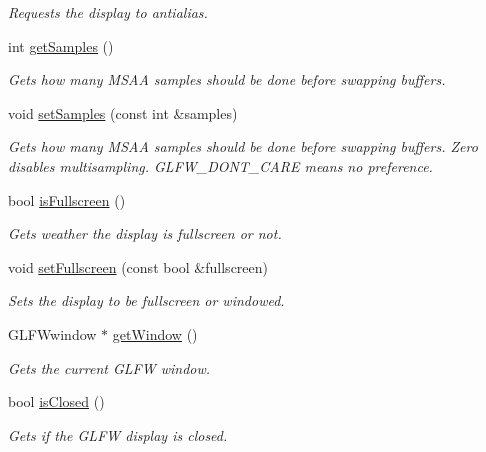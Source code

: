 \begin{DoxyCompactItemize}
\begin{DoxyCompactList}\small\item\em Requests the display to antialias. \end{DoxyCompactList}\item 
int \hyperlink{classflounder_1_1display_a3f1438e0d64121ae94e3e1f1931dc09a}{get\+Samples} ()
\begin{DoxyCompactList}\small\item\em Gets how many M\+S\+AA samples should be done before swapping buffers. \end{DoxyCompactList}\item 
void \hyperlink{classflounder_1_1display_ae1bf2028faaf411fedc80ca511a2e739}{set\+Samples} (const int \&samples)
\begin{DoxyCompactList}\small\item\em Gets how many M\+S\+AA samples should be done before swapping buffers. Zero disables multisampling. G\+L\+F\+W\+\_\+\+D\+O\+N\+T\+\_\+\+C\+A\+RE means no preference. \end{DoxyCompactList}\item 
bool \hyperlink{classflounder_1_1display_ad9a50aad9e26ea3f3a074d1dbe19c58a}{is\+Fullscreen} ()
\begin{DoxyCompactList}\small\item\em Gets weather the display is fullscreen or not. \end{DoxyCompactList}\item 
void \hyperlink{classflounder_1_1display_ae5ee27f982e6a947305dc6e71a23021b}{set\+Fullscreen} (const bool \&fullscreen)
\begin{DoxyCompactList}\small\item\em Sets the display to be fullscreen or windowed. \end{DoxyCompactList}\item 
G\+L\+F\+Wwindow $\ast$ \hyperlink{classflounder_1_1display_a5cdcd3dddce4cf63ac45503b03e96689}{get\+Window} ()
\begin{DoxyCompactList}\small\item\em Gets the current G\+L\+FW window. \end{DoxyCompactList}\item 
bool \hyperlink{classflounder_1_1display_af187a33ad8b4e112a638adfdd3062fb3}{is\+Closed} ()
\begin{DoxyCompactList}\small\item\em Gets if the G\+L\+FW display is closed. \end{DoxyCompactList}\item 

\end{DoxyCompactItemize}
